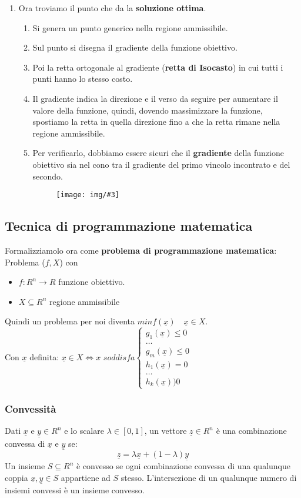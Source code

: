 \documentclass[12pt, twoside, letterpaper]{article}
\newcommand{\img}[3] {
	\begin{figure}[h]
		\caption{#1}
		\centering
		\texttt{[image: img/\#3]}\\
	\end{figure}
}
\begin{document}
\begin{enumerate}
				\item Ora troviamo il punto che da la \textbf{soluzione ottima}.
				\begin{enumerate}
					\item Si genera un punto generico nella regione ammissibile.
					\item Sul punto si disegna il gradiente della funzione obiettivo.
					\item Poi la retta ortogonale al gradiente (\textbf{retta di Isocasto}) in cui tutti i punti hanno lo stesso costo.
					\item Il gradiente indica la direzione e il verso da seguire per aumentare il valore della funzione, quindi, dovendo massimizzare la funzione, spostiamo la retta in quella direzione fino a che la retta rimane nella regione ammissibile.
					\item Per verificarlo, dobbiamo essere sicuri che il \textbf{gradiente} della funzione obiettivo sia nel cono tra il gradiente del primo vincolo incontrato e del secondo.
					\img{}{0.275}{img3.jpg}
				\end{enumerate}
			\end{enumerate}
			
		\subsection{Tecnica di programmazione matematica}
			Formalizziamolo ora come \textbf{problema di programmazione matematica}:\\
			Problema ($f, X$) con 
			\begin{itemize}
				\item $f: R^n \rightarrow R$ funzione obiettivo.
				\item $X \subseteq R^n$ regione ammissibile
			\end{itemize}
			Quindi un problema per noi diventa $min f(\underline{x}) \quad \underline{x} \in X$.\\
			Con $\underline{x}$ definita: $\underline{x} \in X \iff x$ $soddisfa
			\begin{cases} 
				g_1(\underline{x}) \leq 0\\
				\dots \\
				g_m(\underline{x}) \leq 0 \\
				h_1(\underline{x}) = 0 \\
				\dots \\
				h_k(\underline{x}) ) 0
			\end{cases}$
			
			\subsubsection{Convessità}
				Dati $\underline{x}$ e $\underline{y} \in R^n$ e lo scalare $\lambda \in [0,1]$, un vettore $\underline{z} \in R^n$ è una combinazione convessa di $\underline{x}$ e $\underline{y}$ se: $$\underline{z} = \lambda \underline{x} + (1- \lambda) \underline{y}$$
				Un insieme $S \subseteq R^n$ è convesso se ogni combinazione convessa di una qualunque coppia $\underline{x}, \underline{y} \in S$ appartiene ad $S$ stesso. L'intersezione di un qualunque numero di insiemi convessi è un insieme convesso.
			
			
\end{document}
